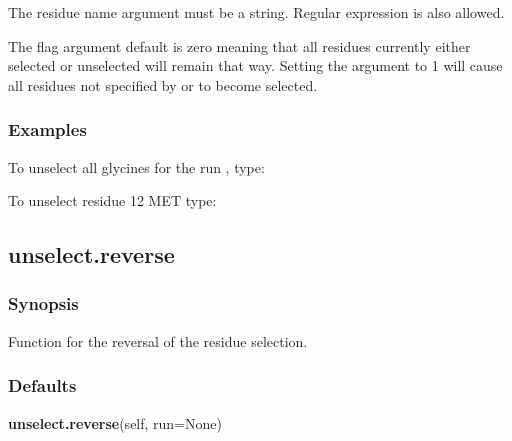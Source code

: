  The residue name argument must be a string.  Regular expression is also allowed. 
  

 The  flag argument default is zero meaning that all residues currently either selected or unselected will remain that way.  Setting the argument to 1 will cause all residues not specified by  or  to become selected. 
  

  
 \subsubsection{Examples} 

 To unselect all glycines for the run , type: 
  



 To unselect residue 12 MET type: 
  






  

 \newpage 

 \subsection{unselect.reverse} 

  
 \subsubsection{Synopsis} 

 Function for the reversal of the residue selection. 
  

  
 \subsubsection{Defaults} 

 \textsf{\textbf{unselect.reverse}(self, run=None)} 

  

